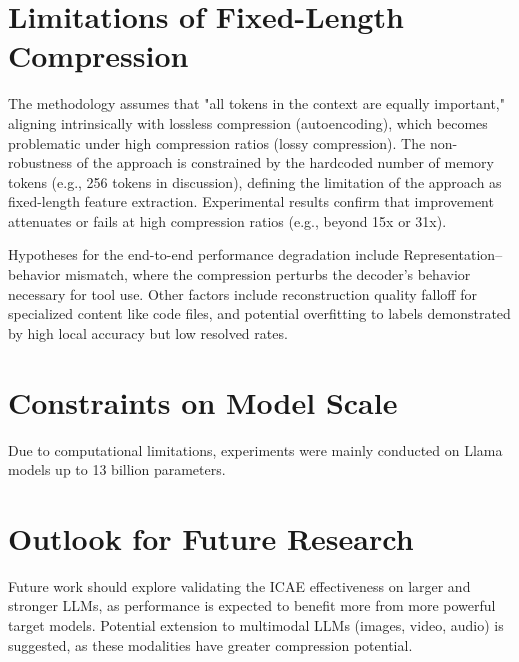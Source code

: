 \section{Limitations of Fixed-Length Compression}

The methodology assumes that "all tokens in the context are equally important," aligning intrinsically with lossless compression (autoencoding), which becomes problematic under high compression ratios (lossy compression).
The non-robustness of the approach is constrained by the hardcoded number of memory tokens (e.g., 256 tokens in discussion), defining the limitation of the approach as fixed-length feature extraction.
Experimental results confirm that improvement attenuates or fails at high compression ratios (e.g., beyond 15x or 31x).

Hypotheses for the end-to-end performance degradation include Representation–behavior mismatch, where the compression perturbs the decoder's behavior necessary for tool use.
Other factors include reconstruction quality falloff for specialized content like code files, and potential overfitting to labels demonstrated by high local accuracy but low resolved rates.

\section{Constraints on Model Scale}

Due to computational limitations, experiments were mainly conducted on Llama models up to 13 billion parameters.


\section{Outlook for Future Research}

Future work should explore validating the ICAE \cite{ge_-context_2024} effectiveness on larger and stronger LLMs, as performance is expected to benefit more from more powerful target models.
Potential extension to multimodal LLMs (images, video, audio) is suggested, as these modalities have greater compression potential.

